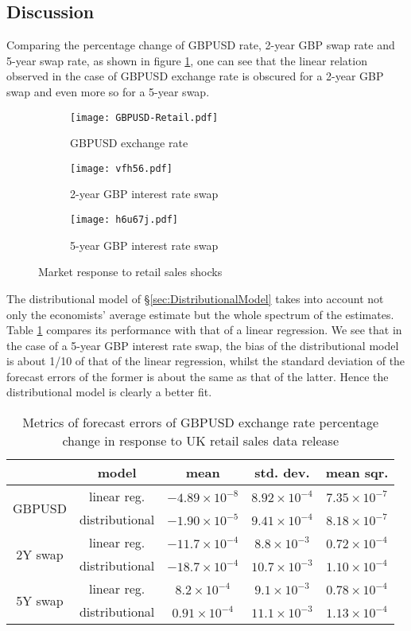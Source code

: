 \documentclass[a4paper,11pt,pdftex,twoside,titlepage]{article}
\begin{document}
\subsection{Discussion}
Comparing the percentage change of GBPUSD rate, 2-year GBP swap rate
and 5-year swap rate, as shown in figure \ref{fig:vgfrh67}, one can see
that the linear relation observed in the case of GBPUSD exchange rate is
obscured for a 2-year GBP swap and even more so for a 5-year swap.
\begin{figure}[htb!]
  \centering
  \begin{subfigure}[b]{0.32\textwidth}
    \texttt{[image: GBPUSD-Retail.pdf]}
    \caption{GBPUSD exchange rate}
  \end{subfigure}
  \begin{subfigure}[b]{0.32\textwidth}
    \texttt{[image: vfh56.pdf]}
    \caption{2-year GBP interest rate swap}
  \end{subfigure}
  \begin{subfigure}[b]{0.32\textwidth}
    \texttt{[image: h6u67j.pdf]}
    \caption{5-year GBP interest rate swap}
  \end{subfigure}
  \caption{Market response to retail sales shocks}
  \label{fig:vgfrh67}
\end{figure}
The distributional model of \S\ref{sec:DistributionalModel} takes into
account not only the economists' average estimate but the whole
spectrum of the estimates. Table \ref{tab:g56hy56} compares its
performance with that of a linear regression. We see that in the case
of a 5-year GBP interest rate swap, the bias of the distributional
model is about 1/10 of that of the linear regression, whilst the
standard deviation of the forecast errors of the former is about the
same as that of the latter. Hence the distributional model is clearly
a better fit.
\begin{table}[htb!]
  \centering
  \begin{tabular}{c|c|c|c|c}
    & model & mean & std. dev. & mean sqr. \\
    \hline
    \multirow{2}{*}{GBPUSD} & linear reg. & $-4.89 \times 10^{-8}$ & $8.92 \times 10^{-4}$ & $7.35 \times 10^{-7}$ \\
    & distributional & $-1.90 \times 10^{-5}$ & $9.41 \times 10^{-4}$ & $8.18 \times 10^{-7}$ \\
    \hline
    \multirow{2}{*}{2Y swap} & linear reg. & $-11.7 \times 10^{-4}$ & $8.8 \times 10^{-3}$ & $0.72 \times 10^{-4}$ \\
    & distributional & $-18.7 \times 10^{-4}$ & $10.7 \times 10^{-3}$ & $1.10 \times 10^{-4}$\\
    \hline
    \multirow{2}{*}{5Y swap} & linear reg. & $8.2 \times 10^{-4}$ & $9.1 \times 10^{-3}$ & $0.78 \times 10^{-4}$ \\
    & distributional & $0.91 \times 10^{-4}$ & $11.1 \times 10^{-3}$ & $1.13 \times 10^{-4}$\\
  \end{tabular}
  \caption{Metrics of forecast errors of GBPUSD exchange rate
    percentage change in response to UK retail sales data 
    release}
  \label{tab:g56hy56}
\end{table}
\end{document}
